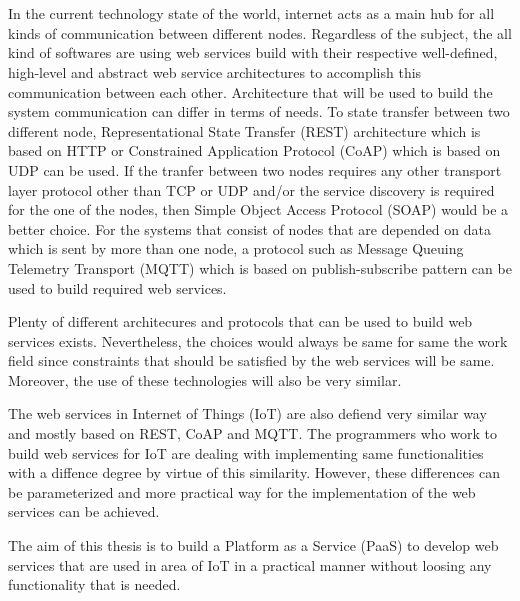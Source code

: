 \chapter{\abstractname}



In the current technology state of the world, internet acts as a main hub for all kinds of communication between different nodes. Regardless of the subject, the all kind of softwares are using web services build with their respective well-defined, high-level and abstract web service architectures to accomplish this communication between each other. Architecture that will be used to build the system communication can differ in terms of needs. To state transfer between two different node, Representational State Transfer (REST) architecture which is based on HTTP or Constrained Application Protocol (CoAP) which is based on UDP can be used. If the tranfer between two nodes requires any other transport layer protocol other than TCP or UDP and/or the service discovery is required for the one of the nodes, then Simple Object Access Protocol (SOAP) would be a better choice. For the systems that consist of nodes that are depended on data which is sent by more than one node, a protocol such as Message Queuing Telemetry Transport (MQTT) which is based on publish-subscribe pattern can be used to build required web services.

Plenty of different architecures and protocols that can be used to build web services exists. Nevertheless, the choices would always be same for same the work field since constraints that should be satisfied by the web services will be same. Moreover, the use of these technologies will also be very similar.

The web services in Internet of Things (IoT) are also defiend very similar way and mostly based on REST, CoAP and MQTT. The programmers who work to build web services for IoT are dealing with implementing same functionalities with a diffence degree by virtue of this similarity. However, these differences can be parameterized and more practical way for the implementation of the web services can be achieved.

The aim of this thesis is to build a Platform as a Service (PaaS) to develop web services that are used in area of IoT in a practical manner without loosing any functionality that is needed.